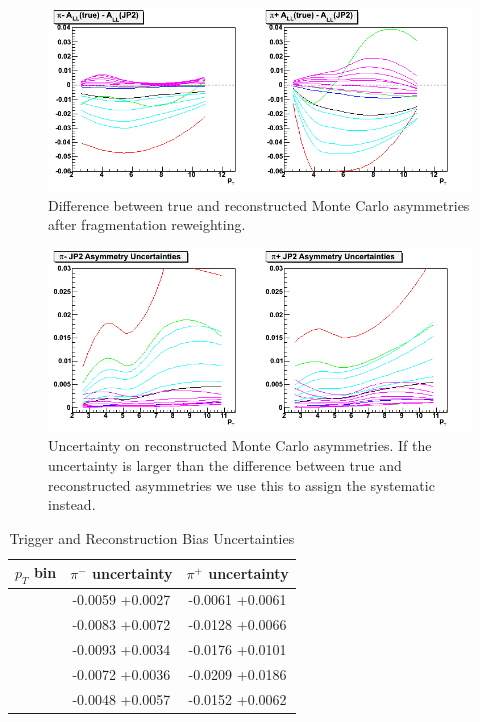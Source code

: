 \begin{figure}
  \includegraphics[width=\textwidth]{figures/mcasym_run5_diff_rescaled}
  \caption{Difference between true and reconstructed Monte Carlo
  asymmetries after fragmentation reweighting.}
  \label{fig:mcasym-diff}
\end{figure}

\begin{figure}
  \includegraphics[width=\textwidth]{figures/mcasym_run5_sigma_rescaled}
  \caption{Uncertainty on reconstructed Monte Carlo asymmetries.  If the uncertainty is larger than the difference between true and reconstructed asymmetries we use this to assign the systematic instead.}
  \label{fig:mcasym-sigma}
\end{figure}

\begin{table}[ht]
    \begin{center}
        \begin{tabular}{c|c|c}
        \hline
        $p_{T}$ bin & $\pi^{-}$ uncertainty & $\pi^{+}$ uncertainty\\
        \hline
        \hline
        [2.00 - 3.18] & -0.0059 +0.0027 & -0.0061 +0.0061\\
        \hline
        [3.18 - 4.56] & -0.0083 +0.0072 & -0.0128 +0.0066\\
        \hline
        [4.56 - 6.32] & -0.0093 +0.0034 & -0.0176 +0.0101\\
        \hline
        [6.32 - 8.80] & -0.0072 +0.0036 & -0.0209 +0.0186\\
        \hline
        [8.80 - 12.84] & -0.0048 +0.0057 & -0.0152 +0.0062\\
    \hline
    \end{tabular}
    \end{center}
    \caption{Trigger and Reconstruction Bias Uncertainties}
    \label{tbl:trig-reco-bias}
\end{table}
